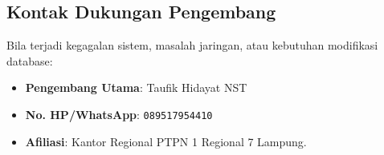 \documentclass[12pt, a4paper]{article}
\begin{document}
\subsection{Kontak Dukungan Pengembang}
Bila terjadi kegagalan sistem, masalah jaringan, atau kebutuhan modifikasi database:
\begin{itemize}
    \item \textbf{Pengembang Utama}: Taufik Hidayat NST
    \item \textbf{No. HP/WhatsApp}: \texttt{089517954410}
    \item \textbf{Afiliasi}: Kantor Regional PTPN 1 Regional 7 Lampung.
\end{itemize}
\end{document}
